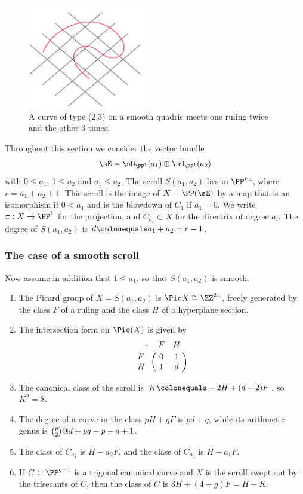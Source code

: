\begin{figure}[b]
\centerline {\includegraphics[width=2in]{main/Fig16-2-new}}
\caption{A curve of type (2,3) on a smooth quadric meets one ruling
twice and the other 3 times.}
\label{2,3 on quadric}
\end{figure}

 Throughout this section we consider the vector
bundle
$$
\sE = \sO_{\PP^1}(a_1) \oplus\sO_{\PP^1}(a_2)
$$
with  $0\leq a_1$, $1\leq a_2$ and  $a_{1}\leq a_{2}$. The
scroll $ S(a_1, a_2)$
lies in
$\PP^r` `$, where $r= a_1+a_2+1$. This scroll
is the image of $X = \PP(\sE)$ by a map that is an isomorphism
if $0<a_1$ and is the 
blowdown
%
of  $C_1$ if $a_1=0$.  We write $\pi:X
\to \PP^1$ for the projection, and
$C_{a_i}\subset X$ for the directrix of degree $a_i$. The degree of
$S(a_1,a_2)$ is $d \colonequals  a_1+a_2 = r-1$.

\subsubsection*{The case of a  smooth scroll}

Now assume in addition that $1\leq a_{1}$, so that $S(a_{1}, a_{2})$
is smooth.

\begin{theorem}\label{pic of scroll}

\begin{enumerate}

\item The 
Picard group
%
of $X = S(a_1,a_2)$ is $\Pic X \cong \ZZ^2``$, 
freely generated by  the class $F$ of a ruling and the class $H$
of a  hyperplane section.
\item The
intersection form on $\Pic(X)$ is given by
$$
\bordermatrix{\kern 10pt\cdot&F&H\cr
F&0&1\cr
H&1&d
}
\vspace*{3pt}
$$

\item The canonical class of the scroll is $K \colonequals  -2H +(d-2)F$,
so $K^2 = 8$.

\item The degree of a curve in the class $pH+qF$ is $pd+q$, while its
arithmetic genus is
$\tbinom{p}{2}@d+pq-p-q+1$.

\item The class of $C_{a_1}$
is $H-a_2F$, and the class of $C_{a_2}$
is $H-a_1F$.
\item If $C \subset \PP^{g-1}$ is a trigonal canonical curve and $X$
is the scroll swept out by the trisecants of $C$, then the class of $C$
is $3H+(4-g)F = H-K$.
\unif
\end{enumerate}
\end{theorem}

